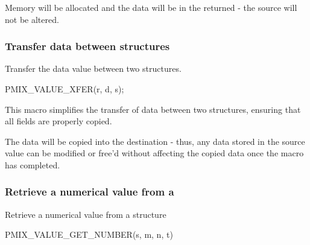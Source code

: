\adviceuserstart
Memory will be allocated and the data will be in the  returned - the source  will not be altered.
\adviceuserend


\subsubsection{Transfer data between  structures}

\summary

Transfer the data value between two  structures.

\cspecificstart
\begin{codepar}
PMIX_VALUE_XFER(r, d, s);
\end{codepar}
\cspecificend

\begin{arglist}
\end{arglist}

\descr

This macro simplifies the transfer of data between two  structures, ensuring that all fields are properly copied.

\adviceuserstart
The data will be copied into the destination  - thus, any data stored in the source value can be modified or free'd without affecting the copied data once the macro has completed.
\adviceuserend


\subsubsection{Retrieve a numerical value from a }

Retrieve a numerical value from a  structure

\cspecificstart
\begin{codepar}
PMIX_VALUE_GET_NUMBER(s, m, n, t)
\end{codepar}
\cspecificend

\begin{arglist}
\end{arglist}

